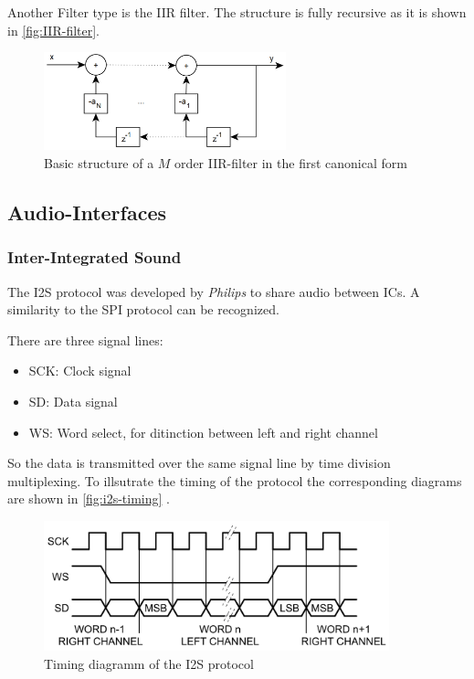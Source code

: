 
Another Filter type is the \ac{IIR} filter. The structure is fully recursive as it is shown in \autoref{fig:IIR-filter}.

\begin{figure}[!h]
    \centering
    \includegraphics[width=7cm]{img/iir.png}
    \caption{Basic structure of a $M$ order \ac{IIR}-filter in the first canonical form \cite{meyer_signalverarbeitung}}
    \label{fig:IIR-filter}
\end{figure}

\subsection{Audio-Interfaces}

\subsubsection{Inter-Integrated Sound}

The \ac{I2S} protocol was developed by \textit{Philips} to share audio between \acp{IC}.
A similarity to the \ac{SPI} protocol can be recognized.

There are three signal lines:
\begin{itemize}
    \item SCK: Clock signal
    \item SD: Data signal
    \item WS: Word select, for ditinction between left and right channel
\end{itemize}
So the data is transmitted over the same signal line by time division multiplexing. 
To illsutrate the timing of the protocol the corresponding diagrams are shown in \autoref{fig:i2s-timing} \cite{nxp_i2s}.

\begin{figure}[!h]
    \centering
    \includegraphics[width=10cm]{img/i2s_timing.png}
    \caption{Timing diagramm of the \ac{I2S} protocol \cite{nxp_i2s}}
    \label{fig:i2s-timing}
\end{figure}

